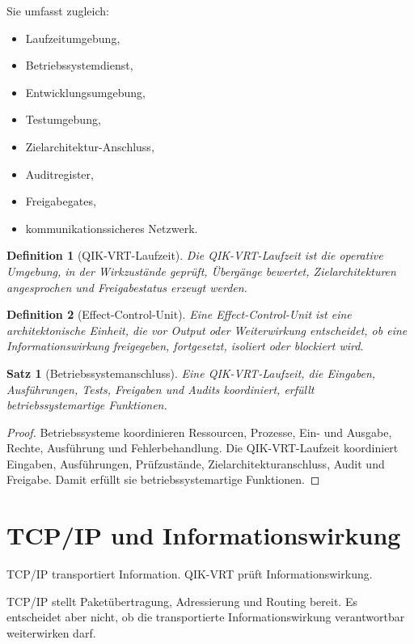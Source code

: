 \documentclass[11pt,a4paper,oneside]{scrartcl}
\theoremstyle{qikstyle}
\newtheorem{definition}{Definition}[section]
\newtheorem{satz}{Satz}[section]
\begin{document}
Sie umfasst zugleich:
\begin{itemize}
\item Laufzeitumgebung,
\item Betriebssystemdienst,
\item Entwicklungsumgebung,
\item Testumgebung,
\item Zielarchitektur-Anschluss,
\item Auditregister,
\item Freigabegates,
\item kommunikationssicheres Netzwerk.
\end{itemize}

\begin{definition}[QIK-VRT-Laufzeit]
Die QIK-VRT-Laufzeit ist die operative Umgebung, in der Wirkzustände geprüft, Übergänge bewertet, Zielarchitekturen angesprochen und Freigabestatus erzeugt werden.
\end{definition}

\begin{definition}[Effect-Control-Unit]
Eine Effect-Control-Unit ist eine architektonische Einheit, die vor Output oder Weiterwirkung entscheidet, ob eine Informationswirkung freigegeben, fortgesetzt, isoliert oder blockiert wird.
\end{definition}

\begin{satz}[Betriebssystemanschluss]
Eine QIK-VRT-Laufzeit, die Eingaben, Ausführungen, Tests, Freigaben und Audits koordiniert, erfüllt betriebssystemartige Funktionen.
\end{satz}

\begin{proof}
Betriebssysteme koordinieren Ressourcen, Prozesse, Ein- und Ausgabe, Rechte, Ausführung und Fehlerbehandlung. Die QIK-VRT-Laufzeit koordiniert Eingaben, Ausführungen, Prüfzustände, Zielarchitekturanschluss, Audit und Freigabe. Damit erfüllt sie betriebssystemartige Funktionen.
\end{proof}
\newpage

\section{TCP/IP und Informationswirkung}

TCP/IP transportiert Information. QIK-VRT prüft Informationswirkung.

TCP/IP stellt Paketübertragung, Adressierung und Routing bereit. Es entscheidet aber nicht, ob die transportierte Informationswirkung verantwortbar weiterwirken darf.
\end{document}
